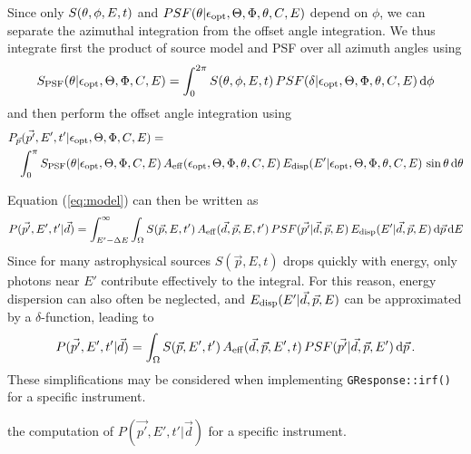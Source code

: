 \documentclass{article}[12pt,a4]
\begin{document}
Since only $S(\mbox{$\theta$}, \phi, E, t)$ and $PSF(\theta | \mbox{$\epsilon_{\rm opt}$}, \mbox{$\Theta$}, \mbox{$\Phi$}, \mbox{$\theta$}, \mbox{$C$}, E)$ depend on 
$\phi$, we can separate the azimuthal integration from the offset angle integration.
We thus integrate first the product of source model and PSF over all azimuth angles using
\begin{equation}
S_{\rm PSF}(\mbox{$\theta$} | \mbox{$\epsilon_{\rm opt}$}, \mbox{$\Theta$}, \mbox{$\Phi$}, \mbox{$C$}, E) = 
\int_{0}^{2 \pi} S(\mbox{$\theta$}, \phi, E, t) \, PSF(\mbox{$\delta$} | \mbox{$\epsilon_{\rm opt}$}, \mbox{$\Theta$}, \mbox{$\Phi$}, \mbox{$\theta$}, \mbox{$C$}, E) \, {\rm d}\phi
\end{equation}
and then perform the offset angle integration using
\begin{eqnarray}
\lefteqn{P_{\vec{p}}(\vec{p'}, E', t' | \opt, \zen, \azm, \conf, E) =} & & \nonumber \\
& & \int_0^{\pi}
S_{\rm PSF}(\off | \opt, \zen, \azm, \conf, E) \,
A_{\rm eff}(\opt, \zen, \azm, \off, \conf, E) \,
E_{\rm disp}(E' | \opt, \zen, \azm, \off, \conf, E) \,
\sin \off \, {\rm d}\off
\end{eqnarray}

Equation (\ref{eq:model}) can then be written as
\begin{equation}
P(\vec{p'}, E', t' | \vec{d}) = \int_{E'-\Delta E}^{\infty} \int_{\Omega} 
  S(\vec{p}, E, t') \, 
  A_{\rm eff}(\vec{d}, \vec{p}, E, t') \,
  PSF(\vec{p'} | \vec{d}, \vec{p}, E) \,
  E_{\rm disp}(E' | \vec{d}, \vec{p}, E) \, {\rm d}\vec{p} \, {\rm d}E
\end{equation}
Since for many astrophysical sources $S(\vec{p}, E, t)$ drops quickly with energy, only
photons near $E'$ contribute effectively to the integral.
For this reason, energy dispersion can also often be neglected, and
$E_{\rm disp}(E' | \vec{d}, \vec{p}, E)$ can be approximated by a $\delta$-function,
leading to
\begin{equation}
P(\vec{p'}, E', t' | \vec{d})  = \int_{\Omega} 
  S(\vec{p}, E', t') \,
  A_{\rm eff}(\vec{d}, \vec{p}, E', t) \,
  PSF(\vec{p'} | \vec{d}, \vec{p}, E') \, {\rm d}\vec{p} \, .
\end{equation}
These simplifications may be considered when implementing 
{\tt GResponse::irf()}
for a specific instrument.

the computation of
$P(\vec{p'}, E', t' | \vec{d})$ for a specific instrument.
\end{document}
